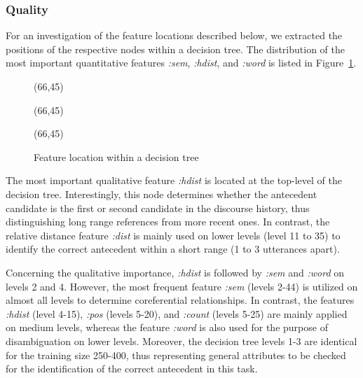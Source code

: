 \subsubsection{Quality}

For an investigation of the feature locations described below, we extracted the positions
of the respective nodes within a decision tree. The distribution of the most important quantitative features
{\em :sem}, {\em :hdist}, and {\em :word}
is listed in Figure~\ref{pic-feature-location}.

\begin{figure}[t]       
  \begin{center}
    \hspace*{-1cm}

\begin{minipage}{.43\linewidth}
        \begin{center}
                 \atari(66,45)
        \end{center}
\end{minipage}
\begin{minipage}{.5\linewidth}
        \begin{center}
                 \atari(66,45)
        \end{center}
\end{minipage}
\atari(66,45)

    \caption{Feature location within a decision tree}\label{pic-feature-location}
  \vspace*{-0.5\baselineskip}
  \end{center}
\end{figure}

The most important qualitative feature {\em :hdist} is located at the top-level of the
decision tree. Interestingly, this node determines  whether the antecedent candidate
is the first or second candidate in the discourse history, thus distinguishing long range
references from more recent ones. In contrast, the relative distance feature {\em :dist}
is mainly used on lower levels (level 11 to 35) to identify the correct antecedent
within a short range (1 to 3 utterances apart).

Concerning the qualitative importance, {\em :hdist} is followed by {\em :sem}
and {\em :word} on levels 2 and 4. 
However, the most frequent feature {\em :sem} (levels 2-44) is utilized on almost all levels to
determine coreferential relationships. In contrast, the features {\em :hdist} (level 4-15),
{\em :pos} (levels 5-20), and {\em :count} (levels 5-25) are mainly applied on medium levels,
whereas the feature {\em :word} is also used for the purpose of disambiguation on lower levels.
Moreover, the decision tree levels 1-3 are identical for the training size 250-400, thus
representing general attributes to be checked for the identification
of the correct antecedent in this task. 

